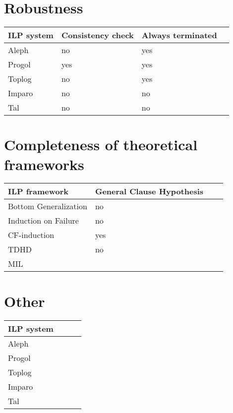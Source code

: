\section{Robustness}
\begin{center}
    \begin{tabular}{ | l | l | l | p{5cm} |}
    \hline
    ILP system & Consistency check & Always terminated\\ \hline
    Aleph & no & yes\\ \hline
    Progol & yes & yes\\ \hline
    Toplog & no & yes\\ \hline
    Imparo & no & no\\ \hline
    Tal & no & no\\ \hline
    \hline
    \end{tabular}
\end{center}

\section{Completeness of theoretical frameworks}
    \begin{tabular}{ | l | l | l | p{5cm} |}
    \hline
    ILP framework & General Clause Hypothesis\\ \hline
    Bottom Generalization & no\\ \hline
    Induction on Failure & no\\ \hline
    CF-induction & yes\\ \hline
    TDHD & no\\ \hline
    MIL & \\ \hline
    \hline
    \end{tabular}

\section{Other}
\begin{center}
    \begin{tabular}{ | l | l | l | p{5cm} |}
    \hline
    ILP system & \\ \hline
    Aleph & \\ \hline
    Progol & \\ \hline
    Toplog & \\ \hline
    Imparo & \\ \hline
    Tal & \\ \hline
    \hline
    \end{tabular}
\end{center}

